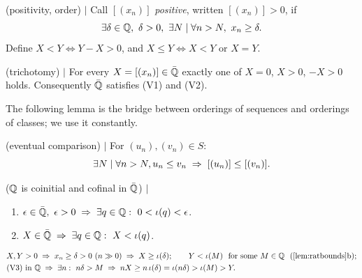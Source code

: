 
\begin{definition} (positivity, order) $\mid$
Call $[(x_n)]$ \emph{positive}, written $[(x_n)]>0$, if
\[
\exists \delta\in\Q,\ \delta>0,\ \exists N \mid \forall n>N,\ x_n\ge \delta .
\]
Define $X<Y \iff Y-X>0$, and $X\le Y\iff X<Y$ or $X=Y$.
\end{definition}


\begin{lemma} (trichotomy) $\mid$ \label{lem:tri}
For every $X=[(x_n)]\in\bar{\mathbb{Q}}$ exactly one of $X=0$, $X>0$, $-X>0$ holds.
Consequently $\bar{\mathbb{Q}}$ satisfies (V1) and (V2).
\end{lemma}

The following lemma is the bridge between orderings of sequences and
orderings of classes; we use it constantly.

\begin{lemma} (eventual comparison) $\mid$ \label{lem:evcomp}
For $(u_n),(v_n)\in S$:
\[
\exists N \mid \forall n>N, u_n\le v_n \;\Rightarrow\; [(u_n)]\le[(v_n)] .
\]
\end{lemma}

\begin{lemma} ($\mathbb{Q}$ is coinitial and cofinal in $\bar{\mathbb{Q}}$) $\mid$ \label{lem:ratbounds}
\begin{enumerate}[nosep,leftmargin=3em]
    \item[(a)] $\epsilon\in\bar{\mathbb{Q}},\ \epsilon>0 \;\Rightarrow\; \exists q\in\mathbb{Q}:\ 0<\iota(q)<\epsilon$.
    \item[(b)] $X\in\Qb \imp \exists q\in\Q:\ X<\iota(q)$.
\end{enumerate}
\end{lemma}

\begin{align*}
&X,Y>0 \imp x_n\ge\delta>0\ev \imp X\ge\iota(\delta);\qquad
Y<\iota(M)\ \text{ for some } M\in\Q\ \ (\ref{lem:ratbounds}\text{b});\\
&\text{(V3) in } \Q \imp \exists n:\ n\delta>M \imp nX\ge n\,\iota(\delta)=\iota(n\delta)>\iota(M)>Y.
\end{align*}

